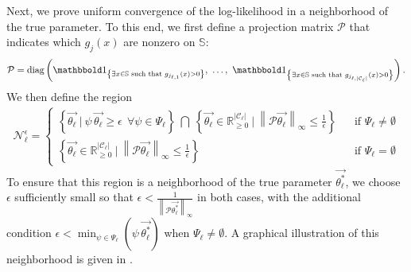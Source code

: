 \documentclass[pdflatex,sn-mathphys-num]{sn-jnl}%
\theoremstyle{thmstyleone}%
\theoremstyle{thmstyletwo}%
\theoremstyle{thmstylethree}%
\begin{document}
\begin{appendices}
Next, we prove uniform convergence of the log-likelihood in a neighborhood of the true parameter. 
To this end, we first define a projection matrix $\mathcal P$ that indicates which $g_j(x)$ are nonzero on $\mathbb S$:
\begin{align}\label{eq. projection to effective space}
    \mathcal P   = \text{diag}\left(
         \mathbbold 1_{\left\{\exists x \in\mathbb S \text{ such that } g_{j_{\ell,1}}(x)>0 \right\}}, ~ \dots, ~
        \mathbbold 1_{\left\{\exists x \in\mathbb S \text{ such that } g_{j_{\ell,|\mathcal C_\ell|}}(x)>0 \right\}}
    \right).
\end{align}
We then define the region
\begin{align}
    \mathcal N_{\ell}^\epsilon
    = \left\{
    \begin{array}{ccr}
         \left\{\overrightarrow{\theta_\ell}
         ~\Big|~
    \psi \,\overrightarrow{\theta_\ell} \geq \epsilon~~\forall \psi \in \Psi_\ell
    \right\} ~\bigcap ~
    \left\{ \overrightarrow{\theta_\ell} \in \mathbb R^{|\mathcal C_\ell|}_{\geq 0}~\Big|~  \left\|\mathcal P\overrightarrow{\theta_\ell}  \right\|_{\infty} \leq \frac{1}{\epsilon} \right\}
    & & \text{if $\Psi_\ell\neq \emptyset$}\\
      \left\{ \overrightarrow{\theta_\ell} \in \mathbb R^{|\mathcal C_\ell|}_{\geq 0} ~\Big|~  \left\|\mathcal P\overrightarrow{\theta_\ell}  \right\|_{\infty} \leq \frac{1}{\epsilon} \right\}   & & \text{if $\Psi_\ell = \emptyset$}
    \end{array}
    \right.
\end{align}
To ensure that this region is a neighborhood of the true parameter $\overrightarrow{\theta^*_\ell}$, we choose $\epsilon$ sufficiently small so that $\epsilon < \frac{1}{ \left\|\mathcal P\overrightarrow{\theta^*_\ell}  \right\|_{\infty}}$ in both cases, with the additional condition $\epsilon < \min_{\psi\in\Psi_\ell} \left(\psi \,\overrightarrow{\theta^*_\ell}\right)$ when $\Psi_\ell\neq \emptyset$. 
A graphical illustration of this neighborhood is given in .

\begin{figure}[h]
    \centering
\end{figure}
\end{appendices}
\end{document}
